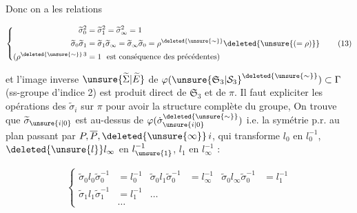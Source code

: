 
Donc on a les relations

\[
\left\{\begin{aligned}
\widetilde\sigma_0^2&=\widetilde\sigma_1^2=\widetilde\sigma_\infty^2=1\\
\widetilde\sigma_0\widetilde\sigma_1&=\widetilde\sigma_1\widetilde\sigma_\infty=\widetilde\sigma_\infty\widetilde\sigma_0=\rho^{\deleted{\unsure{\sim}}}\deleted{\unsure{(=\rho)}}\\
(\rho^{\deleted{\unsure{\sim}}\,3}&=1\ \text{ est conséquence des précédentes})
\end{aligned}\right. \tag*{(13)}
\]


et l'image inverse $\unsure{\widetilde\Sigma|\widetilde E}$ de $\varphi({\unsure{\mathfrak S_3|\mathcal S_3}}^{\deleted{\unsure{\sim}}})\subset\Gamma$ (ss-groupe d'indice 2) est produit  direct de $\mathfrak S_3$ et de $\pi$. Il faut expliciter les opérations des $\widetilde\sigma_i$ sur $\pi$ pour avoir la structure complète du groupe, On trouve que $\widetilde\sigma_{\unsure{i|0}}$ est au-dessus de $\varphi(\dot\sigma_{\unsure{i|0}}^{\deleted{\unsure{\sim}}})$ i.e. la symétrie p.r. au plan passant par $P,\overline P,\deleted{\unsure{\infty}}\,i$, qui transforme $l_0$ en $l_0^{-1}$, $\deleted{\unsure{l}}l_\infty$ en $l_{\unsure{1}}^{-1}$, $l_1$ en $l_\infty^{-1}$ :



\[
\left\{\begin{aligned}
\widetilde\sigma_0 l_0\widetilde\sigma_0^{-1}&=l_0^{-1}&
\widetilde\sigma_0 l_1\widetilde\sigma_0^{-1}&=l_\infty^{-1}&
\widetilde\sigma_0 l_\infty\widetilde\sigma_0^{-1}&=l_1^{-1}\\
\widetilde\sigma_1 l_1\widetilde\sigma_1^{-1}&=l_1^{-1}&\ldots\\
&\ldots
\end{aligned}\right. \tag*{(14)}
\]

